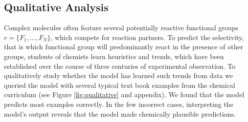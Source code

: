 \subsection{Qualitative Analysis}

Complex molecules often feature several potentially reactive functional groups $r=\{F_1,...,F_N\}$, which compete for reaction partners. 
To predict the selectivity, that is which functional group will predominantly react in the presence of other groups, 
students of chemists learn heuristics and trends, 
which have been established over the course of three centuries of experimental observation.
To qualitatively study whether the model has learned such trends from data we queried the model with several typical text book examples from the chemical curriculum (see Figure \ref{fig:qualitative} and appendix). 
We found that the model predicts most examples correctly. In the few incorrect cases, interpreting the model's output reveals that the model made chemically plausible predictions.

